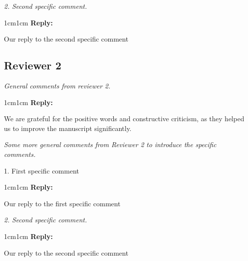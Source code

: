 \documentclass[11pt]{article}
\newenvironment{reviewer}{\itshape}{}
\newenvironment{reply}{%
    \begin{adjustwidth}{1cm}{1cm}%
    \color{grayreply}\textbf{Reply:\ }%
    \ignorespaces%
}{\end{adjustwidth}}
\begin{document}
\begin{minipage}{\linewidth}
    \begin{reviewer}
        2. Second specific comment.
    \end{reviewer}

    \begin{reply}
        Our reply to the second specific comment
    \end{reply}
\end{minipage}

\subsection*{Reviewer 2}

\begin{minipage}{\linewidth}
    \begin{reviewer}
        General comments from reviewer 2.
    \end{reviewer}

    \begin{reply}
        We are grateful for the positive words and constructive criticism, as they helped us to improve the manuscript significantly.
    \end{reply}
\end{minipage}


\begin{minipage}{\linewidth}
    \begin{reviewer}
        Some more general comments from Reviewer 2 to introduce the specific comments.

        1. First specific comment
    \end{reviewer}

    \begin{reply}
        Our reply to the first specific comment
    \end{reply}
\end{minipage}


\begin{minipage}{\linewidth}
    \begin{reviewer}
        2. Second specific comment.
    \end{reviewer}

    \begin{reply}
        Our reply to the second specific comment
    \end{reply}
\end{minipage}
\end{document}
